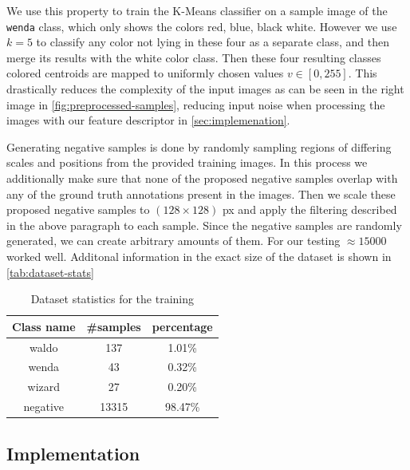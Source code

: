 \documentclass[11pt]{article}
\begin{document}
We use this property to train the K-Means classifier on a sample image of the \verb|wenda| class, which only 
shows the colors red, blue, black white. However we use \( k=5 \) to classify any color not lying in these four as a separate class, and then merge 
its results with the white color class. Then these four resulting classes colored centroids are mapped to uniformly
chosen values \( v \in [0, 255] \). This drastically reduces the complexity of the input images as can be seen in the right image in \autoref{fig:preprocessed-samples},
reducing input noise when processing the images with our feature descriptor in \autoref{sec:implemenation}.

\vspace{0.5cm}
Generating negative samples is done by randomly sampling regions of differing scales and positions from the provided training images.
In this process we additionally make sure that none of the proposed negative samples overlap with any of the ground truth annotations present in the images.
Then we scale these proposed negative samples to \( (128 \times 128 ) \) px and apply the filtering described in the above paragraph to each sample.
Since the negative samples are randomly generated, we can create arbitrary amounts of them. 
For our testing \( \approx15000 \) worked well. 
Additonal information in the exact size of the dataset is shown in \autoref{tab:dataset-stats}

\begin{table}[]
    \centering
    \begin{tabular}{ccc}
        \toprule
        Class name & \#samples & percentage \\
        \midrule
        waldo & 137 &  1.01\% \\
        wenda & 43&  0.32\% \\
        wizard& 27&  0.20\% \\
        negative & 13315&  98.47\% \\
        \bottomrule
    \end{tabular}
    \caption{Dataset statistics for the training}
    \label{tab:dataset-stats}
\end{table}


\subsection{Implementation}\label{sec:implemenation}
\end{document}

